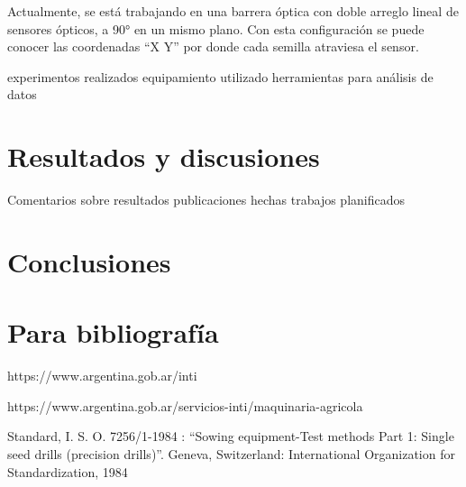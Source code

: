 \documentclass[12pt]{article}
\begin{document}
	Actualmente, se está trabajando en una barrera óptica con doble arreglo lineal de sensores ópticos, a 90° en un mismo plano. Con esta configuración se puede conocer las coordenadas ``X Y'' por donde cada semilla atraviesa el sensor.
	
    experimentos realizados
    equipamiento utilizado
    herramientas para análisis de datos    
    
    
    \section{Resultados y discusiones}
    
    Comentarios sobre resultados
    publicaciones hechas
    trabajos planificados
    
    
	\section{Conclusiones}
	
	\section{Para bibliografía}
	

	
    
    
    \begin{thebibliography}{8}

    https://www.argentina.gob.ar/inti

    https://www.argentina.gob.ar/servicios-inti/maquinaria-agricola
    
     Standard, I. S. O. 7256/1-1984 : ``Sowing equipment-Test methods Part 1: Single seed drills (precision drills)''. Geneva, Switzerland: International Organization for Standardization, 1984
    \end{thebibliography}
    
\end{document}
